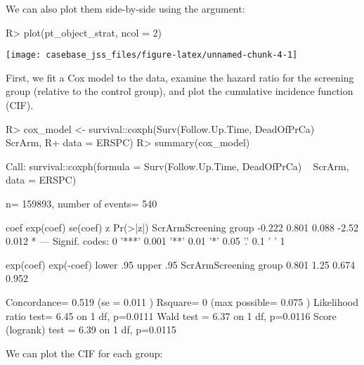 \documentclass[article]{jss}
\begin{document}
We can also plot them side-by-side using the  argument:

\begin{CodeChunk}

\begin{CodeInput}
R> plot(pt_object_strat, ncol = 2)
\end{CodeInput}


\begin{center}\texttt{[image: casebase\_jss\_files/figure-latex/unnamed-chunk-4-1]} \end{center}

\end{CodeChunk}

First, we fit a Cox model to the data, examine the hazard ratio for the
screening group (relative to the control group), and plot the cumulative
incidence function (CIF).

\begin{CodeChunk}

\begin{CodeInput}
R> cox_model <- survival::coxph(Surv(Follow.Up.Time, DeadOfPrCa) ~ ScrArm, 
R+                              data = ERSPC)
R> summary(cox_model)
\end{CodeInput}

\begin{CodeOutput}
Call:
survival::coxph(formula = Surv(Follow.Up.Time, DeadOfPrCa) ~ 
    ScrArm, data = ERSPC)

  n= 159893, number of events= 540 

                        coef exp(coef) se(coef)     z Pr(>|z|)  
ScrArmScreening group -0.222     0.801    0.088 -2.52    0.012 *
---
Signif. codes:  0 '***' 0.001 '**' 0.01 '*' 0.05 '.' 0.1 ' ' 1

                      exp(coef) exp(-coef) lower .95 upper .95
ScrArmScreening group     0.801       1.25     0.674     0.952

Concordance= 0.519  (se = 0.011 )
Rsquare= 0   (max possible= 0.075 )
Likelihood ratio test= 6.45  on 1 df,   p=0.0111
Wald test            = 6.37  on 1 df,   p=0.0116
Score (logrank) test = 6.39  on 1 df,   p=0.0115
\end{CodeOutput}
\end{CodeChunk}

We can plot the CIF for each group:
\end{document}
